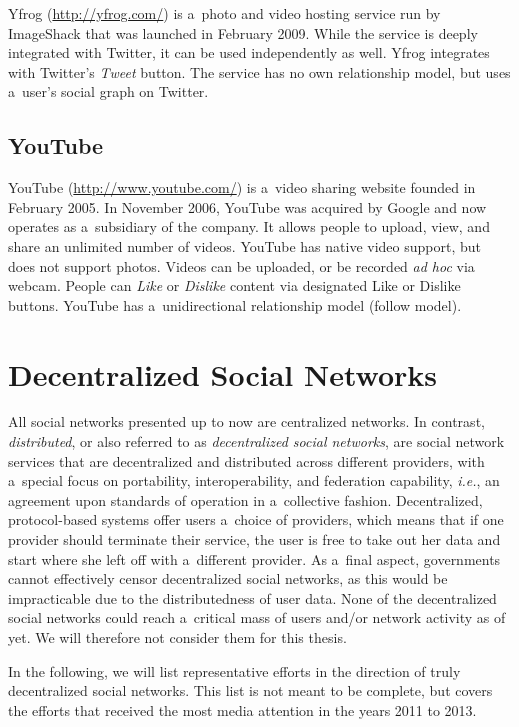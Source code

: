 Yfrog (\url{http://yfrog.com/})
is a~photo and video hosting service run by ImageShack
that was launched in February 2009.
While the service is deeply integrated with Twitter,
it can be used independently as well.
Yfrog integrates with Twitter's \emph{Tweet} button.
The service has no own relationship model,
but uses a~user's social graph on Twitter.

\subsection{YouTube}

YouTube (\url{http://www.youtube.com/})
is a~video sharing website founded in February 2005.
In November 2006, YouTube was acquired by Google
and now operates as a~subsidiary of the company.
It allows people to upload, view,
and share an unlimited number of videos.
YouTube has native video support, but does not support photos.
Videos can be uploaded, or be recorded \emph{ad hoc} via webcam.
People can \emph{Like} or \emph{Dislike} content
via designated Like or Dislike buttons.
YouTube has a~unidirectional relationship model (follow model).

\section{Decentralized Social Networks}
All social networks presented up to now are centralized networks.
In contrast, \emph{distributed}, or also referred to as
\emph{decentralized social networks}, are
social network services that are decentralized and distributed
across different providers, with a~special focus on
portability, interoperability, and federation capability,
\emph{i.e.}, an agreement upon standards of operation
in a~collective fashion.
Decentralized, protocol-based systems
offer users a~choice of providers, which means
that if one provider should terminate their service,
the user is free to take out her data and start
where she left off with a~different provider.
As a~final aspect, governments cannot effectively censor
decentralized social networks,
as this would be impracticable
due to the distributedness of user data.
None of the decentralized social networks could reach
a~critical mass of users and/or network activity as of yet.
We will therefore not consider them for this thesis.

In the following, we will list representative efforts
in the direction of truly decentralized social networks.
This list is not meant to be complete,
but covers the efforts that received the most media attention
in the years 2011 to 2013.

